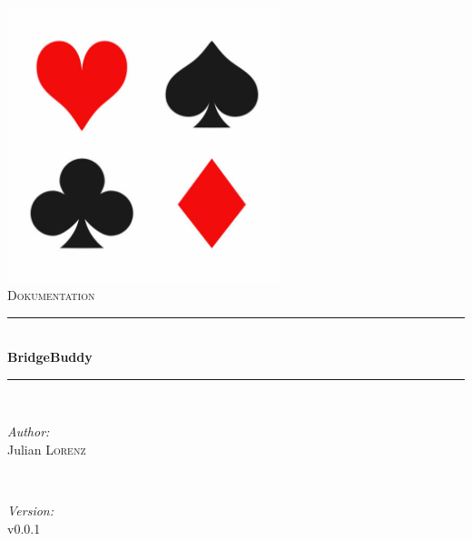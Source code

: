 \begin{titlepage}

\newcommand{\HRule}{\rule{\linewidth}{0.5mm}} %

\center %

\label{Heading}
\includegraphics[width=8cm]{pictures/logo.jpg}\\[1.5cm] %
\textsc{\Large Dokumentation}\\[0.5cm] %

\HRule \\[0.5cm]
{ \huge \bfseries BridgeBuddy}\\[0.3cm] %
\HRule \\[1.5cm]

\label{Author}
\begin{minipage}{0.4\textwidth}
\begin{flushleft} \large
\emph{Author:}\\
Julian \textsc{Lorenz}
\end{flushleft}
\end{minipage}
~
\begin{minipage}{0.4\textwidth}
\begin{flushright} \large
\emph{Version:} \\
v0.0.1
\end{flushright}
\end{minipage}\\[4cm]



\end{titlepage}
